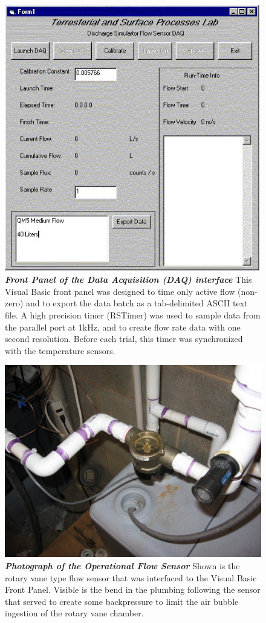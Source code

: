 \documentclass[12pt]{article}
\numberwithin{equation}{section}
\numberwithin{table}{section}
\numberwithin{figure}{section}
\begin{document}
\begin{figure}[ht!]
 \centering\includegraphics[scale=.65]{frontpanel.jpg}
 \caption[Front Panel Screen]{\textbf{\emph{Front Panel of the Data Acquisition (DAQ) interface}} This Visual Basic front panel was designed to time only active flow (non-zero) and to export the data batch as a tab-delimited ASCII text file. A high precision timer (RSTimer) was used to sample data from the parallel port at 1kHz, and to create flow rate data with one second resolution. Before each trial, this timer was synchronized with the temperature sensors.\label{frontpanel}}
\end{figure}

\begin{figure}[ht!]
 \centering\includegraphics[scale=.25]{flowsens.jpg}
 \caption[Flow Sensor]{\textbf{\emph{Photograph of the Operational Flow Sensor}}\label{flowsenser} Shown is the rotary vane type flow sensor that was interfaced to the Visual Basic Front Panel. Visible is the bend in the plumbing following the sensor that served to create some backpressure to limit the air bubble ingestion of the rotary vane chamber.}
\end{figure}
\pagebreak
\end{document}
